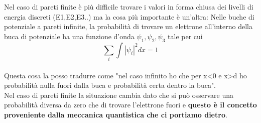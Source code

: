 \begin{minipage}{0.3\textwidth}
\begin{center}
    \label{fig:buca di potenziale con pareti infinite}
\end{center}
\end{minipage}
Nel caso di pareti finite è più difficile trovare i valori in forma chiusa dei livelli di energia discreti (E1,E2,E3..) ma la cosa più importante è un'altra:
Nelle buche di potenziale a pareti infinite, la probabilità di trovare un elettrone all'interno della buca di potenziale ha una funzione d'onda $\psi_1, \psi_2,\psi_3$ tale per cui 
\begin{equation}
    \sum_i \int \left| \psi_i\right|^2 dx=1
\end{equation}
\\%
Questa cosa la posso tradurre come "nel caso infinito ho che per x<0 e x>d ho probabilità nulla fuori dalla buca e probabilità certa dentro la buca".\\
Nel caso di pareti finite la situazione cambia dato che si può osservare una probabilità diversa da zero che di trovare l'elettrone fuori e \textbf{questo è il concetto proveniente dalla meccanica quantistica che ci portiamo dietro}.\\
%
